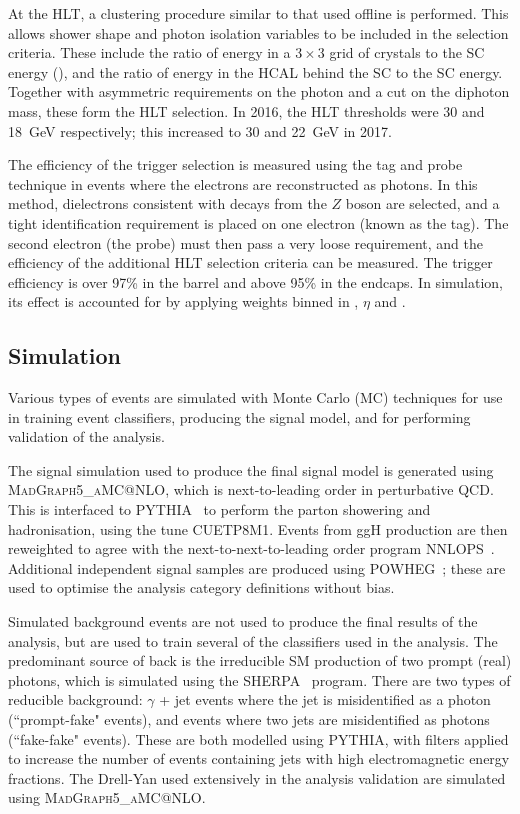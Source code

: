 At the HLT, a clustering procedure similar to that used offline is performed. 
This allows shower shape and photon isolation variables to be included in the selection criteria.
These include the ratio of energy in a $3\times3$ grid of crystals to the SC energy (\RNINE), 
and the ratio of energy in the HCAL behind the SC to the SC energy.
Together with asymmetric requirements on the photon \pt and a cut on the diphoton mass, 
these form the HLT selection.
In 2016, the HLT \pt thresholds were 30 and \SI{18}{GeV} respectively;
this increased to 30 and \SI{22}{GeV} in 2017.

The efficiency of the trigger selection is measured using the tag and probe technique in \Zee events where the electrons are reconstructed as photons.
In this method, dielectrons consistent with decays from the $Z$ boson are selected, 
and a tight identification requirement is placed on one electron (known as the tag).
The second electron (the probe) must then pass a very loose requirement, 
and the efficiency of the additional HLT selection criteria can be measured.
The trigger efficiency is over 97\% in the barrel and above 95\% in the endcaps.
In simulation, its effect is accounted for by applying weights binned in \pt, $\eta$ and \RNINE.

\subsection{Simulation}

Various types of events are simulated with Monte Carlo (MC) techniques for use in training event classifiers, 
producing the signal model, and for performing validation of the analysis.

The signal simulation used to produce the final signal model is generated using \textsc{MadGraph5_{}aMC@NLO}, 
which is next-to-leading order in perturbative QCD.
This is interfaced to \textsc{PYTHIA}~\cite{pythia} to perform the parton showering and hadronisation, 
using the tune \textsc{CUETP8M1}.
Events from ggH production are then reweighted to agree with the next-to-next-to-leading order program \textsc{NNLOPS}~\cite{NNLOPS}.
Additional independent signal samples are produced using \textsc{POWHEG}~\cite{powheg};
these are used to optimise the analysis category definitions without bias.

Simulated background events are not used to produce the final results of the analysis, 
but are used to train several of the classifiers used in the analysis.
The predominant source of back is the irreducible SM production of two prompt (real) photons, 
which is simulated using the \textsc{SHERPA}~\cite{sherpa} program. %
There are two types of reducible background: $\gamma$ + jet events where the jet is misidentified as a photon (``prompt-fake" events), 
and events where two jets are misidentified as photons (``fake-fake" events).
These are both modelled using \textsc{PYTHIA}, 
with filters applied to increase the number of events containing jets with high electromagnetic energy fractions.
The Drell-Yan used extensively in the analysis validation are simulated using \textsc{MadGraph5_{}aMC@NLO}. 

